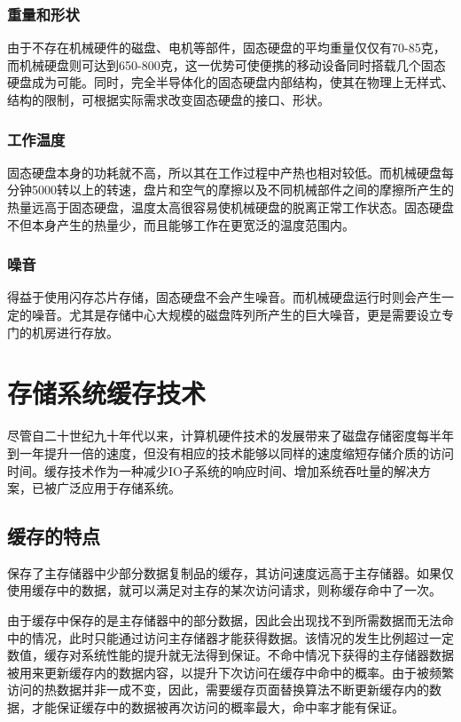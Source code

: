 \subsubsection{重量和形状}
由于不存在机械硬件的磁盘、电机等部件，固态硬盘的平均重量仅仅有70-85克，而机械硬盘则可达到650-800克，这一优势可使便携的移动设备同时搭载几个固态硬盘成为可能。同时，完全半导体化的固态硬盘内部结构，使其在物理上无样式、结构的限制，可根据实际需求改变固态硬盘的接口、形状。

\subsubsection{工作温度}
固态硬盘本身的功耗就不高，所以其在工作过程中产热也相对较低。而机械硬盘每分钟5000转以上的转速，盘片和空气的摩擦以及不同机械部件之间的摩擦所产生的热量远高于固态硬盘，温度太高很容易使机械硬盘的脱离正常工作状态。固态硬盘不但本身产生的热量少，而且能够工作在更宽泛的温度范围内。

\subsubsection{噪音}
得益于使用闪存芯片存储，固态硬盘不会产生噪音。而机械硬盘运行时则会产生一定的噪音。尤其是存储中心大规模的磁盘阵列所产生的巨大噪音，更是需要设立专门的机房进行存放。

\section{存储系统缓存技术}
\label{sec:storage_cache_tech}

尽管自二十世纪九十年代以来，计算机硬件技术的发展带来了磁盘存储密度每半年到一年提升一倍的速度，但没有相应的技术能够以同样的速度缩短存储介质的访问时间。缓存技术\cite{cache2011}作为一种减少IO子系统的响应时间、增加系统吞吐量的解决方案，已被广泛应用于存储系统。

\subsection{缓存的特点}
保存了主存储器中少部分数据复制品的缓存，其访问速度远高于主存储器。如果仅使用缓存中的数据，就可以满足对主存的某次访问请求，则称缓存命中了一次。

由于缓存中保存的是主存储器中的部分数据，因此会出现找不到所需数据而无法命中的情况，此时只能通过访问主存储器才能获得数据。该情况的发生比例超过一定数值，缓存对系统性能的提升就无法得到保证。不命中情况下获得的主存储器数据被用来更新缓存内的数据内容，以提升下次访问在缓存中命中的概率。由于被频繁访问的热数据并非一成不变，因此，需要缓存页面替换算法不断更新缓存内的数据，才能保证缓存中的数据被再次访问的概率最大，命中率才能有保证。

